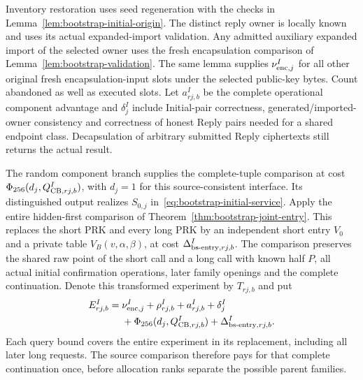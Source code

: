 Inventory restoration uses seed regeneration with the checks in
Lemma~\ref{lem:bootstrap-initial-origin}. The distinct reply owner is
locally known and uses its actual expanded-import validation. Any
admitted auxiliary expanded import of the selected owner uses the
fresh encapsulation comparison of
Lemma~\ref{lem:bootstrap-validation}. The same lemma supplies
$\nu^I_{{\rm enc},j}$ for all other original fresh encapsulation-input
slots under the selected public-key bytes. Count abandoned as well as
executed slots. Let $a^I_{rj,b}$ be the complete operational component
advantage and $\delta^I_j$ include Initial-pair correctness,
generated/imported-owner consistency and correctness of honest Reply
pairs needed for a shared endpoint class. Decapsulation of arbitrary
submitted Reply ciphertexts still returns the actual result.

The random component branch supplies the complete-tuple comparison at
cost $\Phi_{256}(d_j,Q^I_{{\rm CB},rj,b})$, with $d_j=1$ for this
source-consistent interface. Its distinguished output realizes
$S_{0,j}$ in~\eqref{eq:bootstrap-initial-service}. Apply the entire
hidden-first comparison of
Theorem~\ref{thm:bootstrap-joint-entry}. This replaces the short PRK
and every long PRK by an independent short entry $V_0$ and a private
table $V_B(v,\alpha,\beta)$, at cost
$\Delta^I_{{\rm bs\text{-}entry},rj,b}$. The comparison preserves the shared raw
point of the short call and a long call with known half $P$, all actual
initial confirmation operations, later family openings and the complete
continuation. Denote this transformed experiment by $T_{rj,b}$ and put
\begin{equation}
 \begin{split}
 E^I_{rj,b}={}&\nu^I_{{\rm enc},j}+\rho^I_{rj,b}+a^I_{rj,b}
                     +\delta^I_j\\
             &+\Phi_{256}(d_j,Q^I_{{\rm CB},rj,b})
                     +\Delta^I_{{\rm bs\text{-}entry},rj,b}.
 \end{split}
 \label{eq:bootstrap-initial-upstream}
\end{equation}
Each query bound covers the entire experiment in its replacement,
including all later long requests. The source comparison therefore pays
for that complete continuation once, before allocation ranks separate
the possible parent families.

